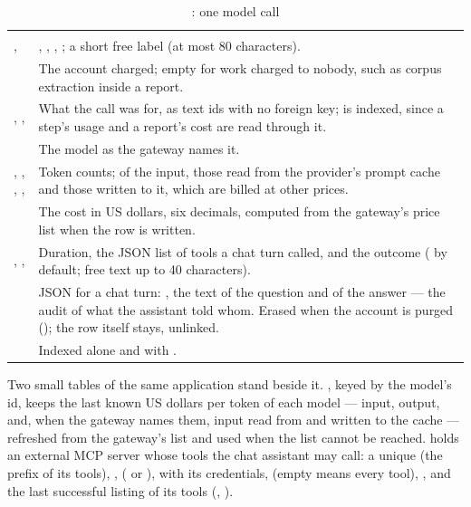 \begin{xltabular}{\textwidth}{@{}L{38mm}Y@{}}
\caption{: one model call}\label{tab:data:lc}\\
\toprule
{} &  \\
\midrule
\endfirsthead
\toprule
{} &  \\
\midrule
\endhead
\bottomrule
\endlastfoot
{},  & , , , ; a short free label (at most 80 characters). \\
 & The account charged; empty for work charged to nobody, such as corpus extraction inside a report. \\
, ,  & What the call was for, as text ids with no foreign key;  is indexed, since a step's usage and a report's cost are read through it. \\
 & The model as the gateway names it. \\
, , , ,  & Token counts; of the input, those read from the provider's prompt cache and those written to it, which are billed at other prices. \\
 & The cost in US dollars, six decimals, computed from the gateway's price list when the row is written. \\
, ,  & Duration, the JSON list of tools a chat turn called, and the outcome ( by default; free text up to 40 characters). \\
 & JSON for a chat turn: , the text of the question and of the answer --- the audit of what the assistant told whom. Erased when the account is purged (); the row itself stays, unlinked. \\
 & Indexed alone and with . \\
\end{xltabular}

Two small tables of the same application stand beside it. , keyed by the
model's id, keeps the last known US dollars per token of each model --- input, output, and,
when the gateway names them, input read from and written to the cache --- refreshed from the
gateway's list and used when the list cannot be reached.  holds an external
MCP server whose tools the chat assistant may call: a unique  (the prefix of its
tools), ,  ( or ),  with its
credentials,  (empty means every tool), , and the last
successful listing of its tools (, ).

